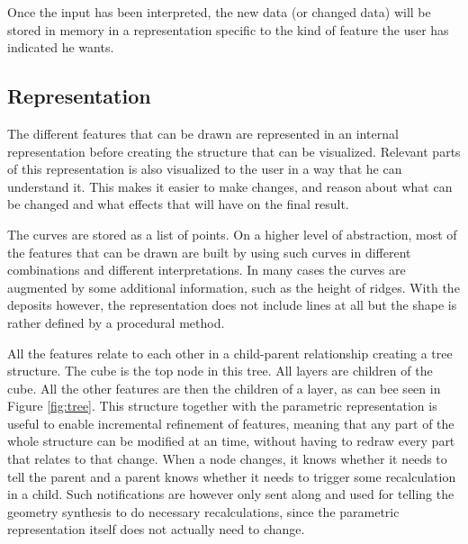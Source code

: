 \documentclass[a4paper,12pt]{report}
\begin{document}
Once the input has been interpreted, the new data (or changed data) will be stored in memory in a representation specific to the kind of feature the user has indicated he wants.

\subsection{Representation}
The different features that can be drawn are represented in an internal representation before creating the structure that can be visualized. Relevant parts of this representation is also visualized to the user in a way that he can understand it. This makes it easier to make changes, and reason about what can be changed and what effects that will have on the final result.


The curves are stored as a list of points. On a higher level of abstraction, most of the features that can be drawn are built by using such curves in different combinations and different interpretations. In many cases the curves are augmented by some additional information, such as the height of ridges. With the deposits however, the representation does not include lines at all but the shape is rather defined by a procedural method.

All the features relate to each other in a child-parent relationship creating a tree structure. The cube is the top node in this tree. All layers are children of the cube. All the other features are then the children of a layer, as can bee seen in Figure \ref{fig:tree}. This structure together with the parametric representation is useful to enable incremental refinement of features, meaning that any part of the whole structure can be modified at an time, without having to redraw every part that relates to that change. When a node changes, it knows whether it needs to tell the parent and a parent knows whether it needs to trigger some recalculation in a child. Such notifications are however only sent along and used for telling the geometry synthesis to do necessary recalculations, since the parametric representation itself does not actually need to change.
\end{document}
